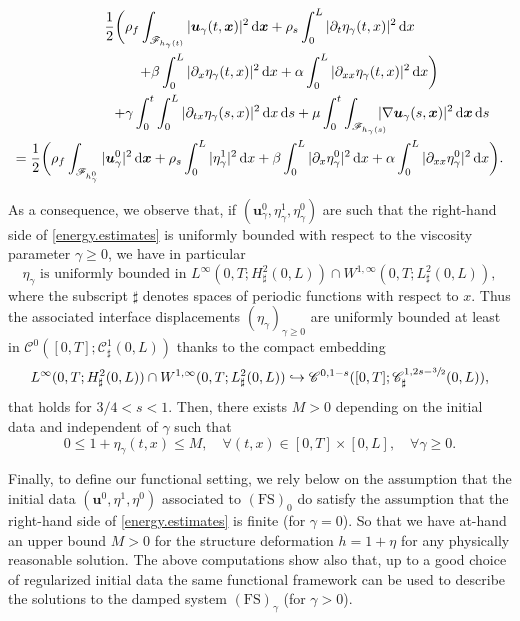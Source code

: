 \documentclass[JEP,XML,SOM,Unicode,NoFloatCountersInSection]{cedram}
\let\mathcal\mathscr
\newcommand\hto{\mathrel{\lhook\joinrel\to}}
\newcommand{\FS}{\mathrm{FS}}
\theoremstyle{remark}
\theoremstyle{definition}
\newcommand{\ug}{\boldsymbol{u}}
\newcommand{\xg}{\boldsymbol{x}}
\newcommand{\dd}{\,\mathrm{d}}
\begin{document}
\begin{multline}\label{energy.estimates}
\frac{1}{2}\biggl(\rho_{f}\int_{\mathcal{F}_{h_{\gamma}(t)}}\vert\ug_{\gamma}(t, \xg) \vert^{2} \dd\xg + \rho_{s}\int_{0}^{L}\vert\partial_{t}\eta_{\gamma}(t, x) \vert^{2} \dd x\\
\hspace*{15mm}+\beta\int_{0}^{L}\vert\partial_{x}\eta_{\gamma}(t, x) \vert^{2} \dd x+\alpha\int_{0}^{L}\vert\partial_{xx}\eta_{\gamma}(t, x) \vert^{2} \dd x \biggr)
\\
\shoveright{+\gamma\int_0^t\int_{0}^{L}\vert\partial_{tx}\eta_{\gamma}(s, x) \vert^{2} \dd x \dd s+ \mu\int_0^t\int_{\mathcal{F}_{h_{\gamma}(s)}}\hspace*{-3mm}\vert \nabla\ug_{\gamma}(s, \xg) \vert^{2} \dd\xg\dd s}\\
=\frac{1}{2}\biggl(\rho_{f}\int_{\mathcal{F}_{h^0_{\gamma}}}\vert\ug^0_{\gamma}\vert^{2} \dd \xg+ \rho_{s}\int_{0}^{L}\vert\eta^1_{\gamma}\vert^{2}\dd x+\beta\int_{0}^{L}\vert\partial_{x}\eta^0_{\gamma}\vert^{2}\dd x+\alpha\int_{0}^{L}\vert\partial_{xx}\eta^0_{\gamma}\vert^{2}\dd x\biggr).
\end{multline}

As a consequence, we observe that, if $(\ug^0_\gamma, \eta^1_\gamma, \eta^0_\gamma)$ are such that the right-hand side of \eqref{energy.estimates} is uniformly bounded with respect to the viscosity parameter $\gamma \geq 0$, we have in particular
\[
\eta_{\gamma}\text{ is uniformly bounded in }L^{\infty}(0,T;H^{2}_{\sharp}(0,L))\cap W^{1,\infty}(0,T;L_{\sharp}^{2}(0,L)),
\]
where the subscript $\sharp$ denotes spaces of periodic functions with respect to $x$.
Thus the associated interface displacements $(\eta_\gamma)_{\gamma \geq 0}$ are uniformly bounded at least in $\mathcal{C}^{0}([0,T];\mathcal{C}^{1}_{\sharp}(0,L))$ thanks to the compact embedding
\begin{equation}
L^{\infty}(0,T;H^{2}_{\sharp}(0,L))\cap W^{1,\infty}(0,T;L_{\sharp}^{2}(0,L))\hto \mathcal{C}^{0,1-s}([0,T];\mathcal{C}^{1,2s-\sfrac{3}{2}}_{\sharp}(0,L)),
\label{inclusion-eta}
\end{equation}
that holds for $3/4<s<1$.
Then, there exists $M>0$ depending on the initial data and independent of $\gamma$ such that
\begin{equation}
\label{borne.eta}
0\leq 1+\eta_\gamma (t, x) \leq M , \quad \forall (t, x) \in [0, T]\times [0, L], \quad \forall\gamma \geq 0.
\end{equation}

Finally, to define our functional setting, we rely below on the assumption that the initial data $(\ug^0, \eta^1, \eta^0)$ associated to $(\FS)_0$ do satisfy the assumption that the right-hand side of \eqref{energy.estimates} is finite (for $\gamma =0$). So that we have at-hand an upper bound $M>0$ for the structure deformation $h=1+\eta$ for any physically reasonable solution.
The above computations show also that, up to a good choice of regularized initial data the same functional framework can be used to describe the solutions to the damped system $(\FS)_{\gamma}$ (for $\gamma >0$).
\end{document}
